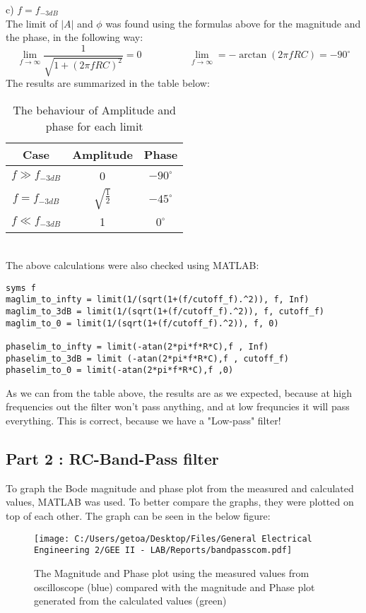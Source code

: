 \documentclass[12pt]{report}
\begin{document}
c) $f = f_{-3dB}$\\
\newpage
The limit of $|A|$ and $\phi$ was found using the formulas above for the magnitude and the phase, in the following way:
$$ \lim_{f \to \infty} \frac{1}{\sqrt{1 + (2\pi f RC)^2}} = 0 \hspace{2cm}  \lim_{f \to \infty} = -\arctan(2 \pi f RC)= -90^\circ$$
The results are summarized in the table below:
\begin{table}[!htp]
\centering
\begin{tabular}{|c|c|c|}
\hline
\textbf{Case} & \textbf{Amplitude} & \textbf{Phase} \\ \hline
$f \gg f_{-3dB}$ & 0 & $-90^\circ$ \\ \hline
$f = f_{-3dB}$ & $\sqrt{\frac{1}{2}}$ & $-45^\circ$ \\ \hline
$f \ll f_{-3dB}$ & 1& $0	^\circ$ \\ \hline
\end{tabular}
\caption{The behaviour of Amplitude and phase for each limit}
\end{table}\\
The above calculations were also checked using MATLAB:
\begin{verbatim}
syms f
maglim_to_infty = limit(1/(sqrt(1+(f/cutoff_f).^2)), f, Inf)
maglim_to_3dB = limit(1/(sqrt(1+(f/cutoff_f).^2)), f, cutoff_f)
maglim_to_0 = limit(1/(sqrt(1+(f/cutoff_f).^2)), f, 0)

phaselim_to_infty = limit(-atan(2*pi*f*R*C),f , Inf)
phaselim_to_3dB = limit (-atan(2*pi*f*R*C),f , cutoff_f)
phaselim_to_0 = limit(-atan(2*pi*f*R*C),f ,0)
\end{verbatim} 

As we can from the table above, the results are as we expected, because at high frequencies out the  filter won't pass anything, and at low frequncies it will pass everything. This is correct, because we have a "Low-pass" filter!
\newpage
\subsection {Part 2 : RC-Band-Pass filter }
To graph the Bode magnitude and phase plot from the measured and calculated values, MATLAB was used. To better compare the graphs, they were plotted on top of each other. The graph can be seen in the below figure:

\begin{figure}[!htp]
\centering
\texttt{[image: C:/Users/getoa/Desktop/Files/General Electrical Engineering 2/GEE II - LAB/Reports/bandpasscom.pdf]}
\caption{The Magnitude and Phase plot using the measured values from oscilloscope (blue) compared with the magnitude and Phase plot generated from the calculated values (green)}
\end{figure}
\end{document}
